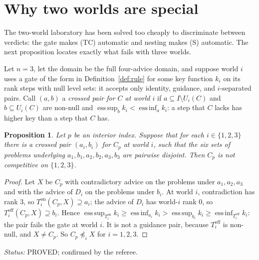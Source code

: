 \documentclass[11pt]{article}
\newtheorem{proposition}[theorem]{Proposition}
\theoremstyle{definition}\newtheorem{definition}[theorem]{Definition}
\theoremstyle{remark}\newtheorem{remark}[theorem]{Remark}
\newcommand{\on}{\mathrm{on}}
\newcommand{\off}{\mathrm{off}}
\newcommand{\esssup}{\operatorname*{ess\,sup}}
\newcommand{\essinf}{\operatorname*{ess\,inf}}
\newcommand{\status}[1]{\par\noindent\emph{Status:} #1\par}
\begin{document}
\section{Why two worlds are special}\label{sec:three}

The two-world laboratory has been solved too cheaply to discriminate between
verdicts: the gate makes (TC) automatic and nesting makes (S) automatic. The
next proposition locates exactly what fails with three worlds.

Let $n=3$, let the domain be the full four-advice domain, and suppose world $i$
uses a gate of the form in Definition~\ref{def:rule} for some key function
$k_i$ on its rank steps with null level sets: it accepts only identity,
guidance, and $i$-separated pairs. Call $(a,b)$ a \emph{crossed pair for $C$ at
world $i$} if $a\subseteq I\setminus U_i(C)$ and $b\subseteq U_i(C)$ are
non-null and $\esssup_bk_i<\essinf_ak_i$: a step that $C$ lacks has higher key
than a step that $C$ has.

\begin{proposition}\label{prop:three}
Let $p$ be an interior index. Suppose that for each $i\in\{1,2,3\}$ there is a
crossed pair $(a_i,b_i)$ for $C_p$ at world $i$, such that the six sets of
problems underlying $a_1,b_1,a_2,b_2,a_3,b_3$ are pairwise disjoint. Then $C_p$
is not competitive on $\{1,2,3\}$.
\end{proposition}
\begin{proof}
Let $X$ be $C_p$ with contradictory advice on the problems under
$a_1,a_2,a_3$ and with the advice of $D_i$ on the problems under $b_i$. At
world $i$, contradiction has rank $3$, so $T^\on_i(C_p,X)\supseteq a_i$; the
advice of $D_i$ has world-$i$ rank $0$, so $T^\off_i(C_p,X)\supseteq b_i$.
Hence $\esssup_{T^\on_i}k_i\ge\essinf_{a_i}k_i>\esssup_{b_i}k_i\ge
\essinf_{T^\off_i}k_i$: the pair fails the gate at world $i$. It is not a
guidance pair, because $T^\off_i$ is non-null, and $X\ne C_p$. So
$C_p\not\preceq_iX$ for $i=1,2,3$.
\end{proof}

\status{PROVED; confirmed by the referee.}
\end{document}
